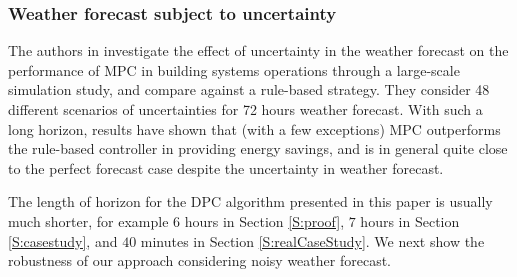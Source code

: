 \textcolor[rgb]{0,0,1}{
\subsubsection{Weather forecast subject to uncertainty}\label{SSS:DisturbanceUncertain}
The authors in \cite{Petersen2014AE} investigate the effect of uncertainty in the weather forecast on the performance of MPC in building systems operations through a large-scale simulation study, and compare against a rule-based strategy.
They consider 48 different scenarios of uncertainties for 72 hours weather forecast.
With such a long horizon, results have shown that (with a few exceptions) MPC outperforms the rule-based controller in providing energy savings, and is in general quite close to the perfect forecast case despite the uncertainty in weather forecast.}

\textcolor[rgb]{0,0,1}{The length of horizon for the DPC algorithm presented in this paper is usually much shorter, for example $6$ hours in Section \ref{S:proof}, $7$ hours in Section \ref{S:casestudy}, and $40$ minutes in Section \ref{S:realCaseStudy}. 
We next show the robustness of our approach considering noisy weather forecast.}


